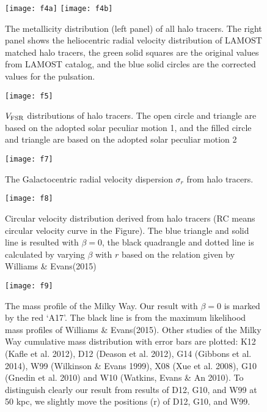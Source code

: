 \documentclass[12pt,preprint]{aastex}
\begin{document}
\clearpage

\begin{figure}
\centering
\texttt{[image: f4a]}
\texttt{[image: f4b]}
\caption{The metallicity distribution (left panel) of all halo tracers. The right panel shows the heliocentric radial velocity distribution of LAMOST matched halo tracers, the green solid squares are the original values from LAMOST catalog, and the blue solid circles are the corrected values for the pulsation.}\label{fig:1}
\end{figure}


\clearpage

\begin{figure}
\centering
\texttt{[image: f5]}
\caption{$V_{\rm FSR}$ distributions of halo tracers. The open circle and triangle are based on the adopted solar peculiar motion 1, and the filled circle and triangle are based on the adopted solar peculiar motion 2}\label{fig:1}
\end{figure}

\clearpage


\clearpage

\begin{figure}
\centering
\texttt{[image: f7]}
\caption{The Galactocentric radial velocity dispersion $\sigma_r$ from halo tracers.}\label{fig:1}
\end{figure}

\clearpage

\begin{figure}
\centering
\texttt{[image: f8]}
\caption{Circular velocity distribution derived from halo
tracers (RC means circular velocity curve in the Figure). The blue triangle and solid line is resulted with $\beta = 0$, the black quadrangle and dotted line is calculated by varying $\beta$ with $r$ based on the relation given by Williams \& Evans(2015)}\label{fig:1}
\end{figure}

\clearpage

\begin{figure}
\centering
\texttt{[image: f9]}
\caption{The mass profile of the Milky Way. Our result with $\beta =0$ is marked by the red `A17'. The black line is from the maximum likelihood mass profiles of Williams \& Evans(2015). Other studies of the Milky Way cumulative mass distribution with error bars are plotted: K12 (Kafle et al. 2012), D12 (Deason et al. 2012), G14 (Gibbons et al. 2014), W99 (Wilkinson \& Evans 1999), X08 (Xue et al. 2008), G10 (Gnedin et al. 2010) and W10 (Watkins, Evans \& An 2010). To distinguish clearly our result from results of D12, G10, and W99 at 50 kpc, we slightly move the positions (r) of D12, G10, and W99.}\label{fig:1}
\end{figure}

\clearpage
\end{document}

